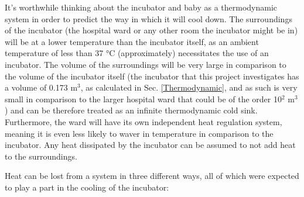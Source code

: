 \documentclass{article}
\begin{document}
\vspace{3mm}

It’s worthwhile thinking about the incubator and baby as a thermodynamic system in order to predict the way in which it will cool down. The surroundings of the incubator (the hospital ward or any other room the incubator might be in) will be at a lower temperature than the incubator itself, as an ambient temperature of less than 37 °C (approximately) necessitates the use of an incubator. The volume of the surroundings will be very large in comparison to the volume of the incubator itself (the incubator that this project investigates has a volume of 0.173 m$^{3}$, as calculated in Sec. \ref{Thermodynamic}, and as such is very small in comparison to the larger hospital ward that could be of the order 10$^{2}$ m$^{3}$) and can be therefore treated as an infinite thermodynamic cold sink. Furthermore, the ward will have its own independent heat regulation system, meaning it is even less likely to waver in temperature in comparison to the incubator. Any heat dissipated by the incubator can be assumed to not add heat to the surroundings.  

 \vspace{3mm}

Heat can be lost from a system in three different ways, all of which were expected to play a part in the cooling of the incubator: 
\end{document}
